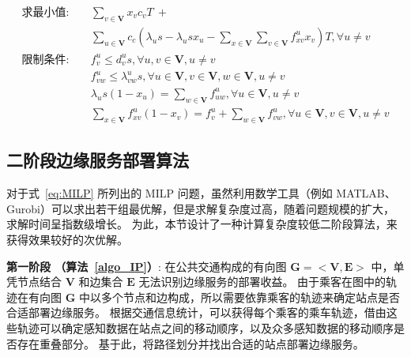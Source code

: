 \begin{equation}
\begin{aligned}
求最小值: &\quad \sum_{v\in \boldsymbol{V}}x_v c_vT \ + \\&\quad \sum_{u\in \boldsymbol{V}}c_c(\lambda_u s -  \lambda_u s x_u - \sum_{x\in \boldsymbol{V}}\sum_{v\in \boldsymbol{V}}f^u_{xv} x_v )T, \forall u \neq v\\
\text{限制条件:} &\quad  f^u_v \leq d^u_v s, \forall u, v\in \boldsymbol{V}, u\neq v\\
&\quad f^u_{vw} \leq \lambda^u_{vw} s, \forall u \in \boldsymbol{V}, v \in \boldsymbol{V}, w \in \boldsymbol{V}, u \neq v\\
&\quad \lambda_u s (1 - x_u) = \sum_{w\in \boldsymbol{V}}f^u_{uw}, \forall u\in \boldsymbol{V}, u \neq v\\
&\quad \sum_{x\in \boldsymbol{V}}f^u_{xv} (1-x_v) = f^u_v + \sum_{w\in \boldsymbol{V}}f^u_{vw}, \forall u\in \boldsymbol{V}, v\in \boldsymbol{V},u \neq v
\end{aligned}
\label{eq:MILP}
\end{equation}

\subsection{二阶段边缘服务部署算法}

对于式~\eqref{eq:MILP} 所列出的 MILP 问题，虽然利用数学工具（例如 MATLAB、Gurobi）可以求出若干组最优解，但是求解复杂度过高，随着问题规模的扩大，求解时间呈指数级增长。
为此，本节设计了一种计算复杂度较低二阶段算法，来获得效果较好的次优解。

\textbf{第一阶段 （算法~\ref{algo_IP}）}:
在公共交通构成的有向图 $\boldsymbol{G}=<\boldsymbol{V}, \boldsymbol{E}>$ 中，单凭节点结合 $\boldsymbol{V}$ 和边集合 $\boldsymbol{E}$ 无法识别边缘服务的部署收益。
由于乘客在图中的轨迹在有向图 $\boldsymbol{G}$ 中以多个节点和边构成，所以需要依靠乘客的轨迹来确定站点是否合适部署边缘服务。
根据交通信息统计，可以获得每个乘客的乘车轨迹，借由这些轨迹可以确定感知数据在站点之间的移动顺序，以及众多感知数据的移动顺序是否存在重叠部分。
基于此，将路径划分并找出合适的站点部署边缘服务。

